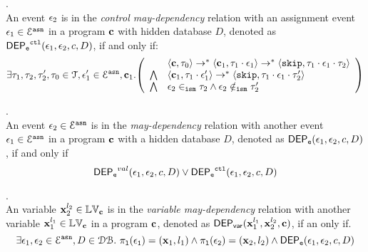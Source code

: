 %
\begin{defn}
\label{def:event_ctldep}.
\\
An event $\mathtt{\epsilon}_2$ is in the \emph{control may-dependency} relation with an assignment
event $\mathtt{\epsilon}_1 \in \mathcal{E}^{\mathtt{{asn}}}$ in a program ${\boldsymbol{\mathbf{c}}}$
with hidden database $D$, denoted as 
%
$\mathsf{DEP_{\mathtt{e}}}^{\mathtt{{ctl}}}(\mathtt{\epsilon}_1, \mathtt{\epsilon}_2, c, D)$, if and only if: 
%
\[
\exists \vtrace_1, \vtrace_2, \vtrace_2', \vtrace_0 \in \mathcal{T}, 
\event_1' \in \eventset^{\asn}, \ssa{c}_1.
\left(
\begin{array}{ll}   
  & \config{\ssa{c}, \vtrace_0} \rightarrow^{*} 
    \config{\ssa{c}_1, \vtrace_1 \cdot \event_1}  \rightarrow^{*} 
    \config{\eskip,  \vtrace_1 \cdot \event_1 \cdot \vtrace_2} 
  \\ 
  \bigwedge &
  \config{\ssa{c}_1, \vtrace_1 \cdot \event_1'}  \rightarrow^{*} 
  \config{\eskip,  \vtrace_1 \cdot \event_1 \cdot \vtrace_2' } 
  \\
  \bigwedge &
  \event_2 \ismin \vtrace_2 \land \event_2 \notismin \vtrace_2'
\end{array}
\right)
 \]
%
\end{defn}
%
%
\begin{defn}.
\label{def:event_dep}
\\ 
An event $\mathtt{\epsilon}_2 \in \mathcal{E}^{\mathtt{{asn}}}$ is in the \emph{may-dependency} relation with another
event $\mathtt{\epsilon}_1 \in \mathcal{E}^{\mathtt{{asn}}}$ in a program ${\boldsymbol{\mathbf{c}}}$ with a hidden database $D$, denoted as $\mathsf{DEP_{\mathtt{e}}}(\mathtt{\epsilon}_1, \mathtt{\epsilon}_2, c, D)$,
if and only if
\[
\mathsf{DEP_{\mathtt{e}}}^{val}(\mathtt{\epsilon}_1, \mathtt{\epsilon}_2, c, D) 
\lor
\mathsf{DEP_{\mathtt{e}}}^{\mathtt{{ctl}}}(\mathtt{\epsilon}_1, \mathtt{\epsilon}_2, c, D) 
\] %
%
\end{defn}
%
\begin{defn}.
\label{def:var_dep}
\\
An variable ${\boldsymbol{\mathbf{x}}}_2^{l_2} \in \mathbb{LV}_{{\boldsymbol{\mathbf{c}}}}$ is in the \emph{variable may-dependency} relation with another
variable ${\boldsymbol{\mathbf{x}}}_1^{l_1} \in \mathbb{LV}_{{\boldsymbol{\mathbf{c}}}}$ in a program ${\boldsymbol{\mathbf{c}}}$, denoted as 
%
$\mathsf{DEP_{var}}({\boldsymbol{\mathbf{x}}}_1^{l_1}, {\boldsymbol{\mathbf{x}}}_2^{l_2}, {\boldsymbol{\mathbf{c}}})$, if an only if.
%
\[
\exists \mathtt{\epsilon}_1, \mathtt{\epsilon}_2 \in \mathcal{E}^{\mathtt{{asn}}}, D \in \mathcal{DB}. ~
\mathtt{\pi_{l}(\mathtt{\epsilon}_1)} = ({\boldsymbol{\mathbf{x}}}_1, l_1)
\land
\mathtt{\pi_{l}(\mathtt{\epsilon}_2)} = ({\boldsymbol{\mathbf{x}}}_2, l_2)
\land 
\mathsf{DEP_{\mathtt{e}}}(\mathtt{\epsilon}_1, \mathtt{\epsilon}_2, c, D)
\] 
%
%
\end{defn}
%

